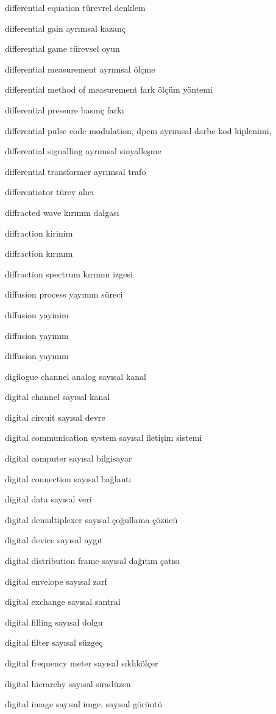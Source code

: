 \documentclass[12pt,fleqn]{article}\usepackage{../../common}
\begin{document}
differential equation türevrel denklem

differential gain ayrımsal kazanç

differential game türevsel oyun

differential measurement ayrımsal ölçme

differential method of measurement fark ölçüm yöntemi

differential pressure basınç farkı

differential pulse code modulation, dpcm ayrımsal darbe kod kiplenimi,

differential signalling ayrımsal sinyalleşme

differential transformer ayrımsal trafo

differentiator türev alıcı

diffracted wave kırınım dalgası

diffraction kirinim

diffraction kırınım

diffraction spectrum kırınım izgesi

diffusion process yayınım süreci

diffusion yayinim

diffusion yayınım

diffusion yayınım

digilogue channel analog sayısal kanal

digital channel sayısal kanal

digital circuit sayısal devre

digital communication system sayısal iletişim sistemi

digital computer sayısal bilgisayar

digital connection sayısal bağlantı

digital data sayısal veri

digital demultiplexer sayısal çoğullama çözücü

digital device sayısal aygıt

digital distribution frame sayısal dağıtım çatısı

digital envelope sayısal zarf

digital exchange sayısal santral

digital filling sayısal dolgu

digital filter sayısal süzgeç

digital frequency meter sayısal sıklıkölçer

digital hierarchy sayısal sıradüzen

digital image sayısal imge, sayısal görüntü
\end{document}
